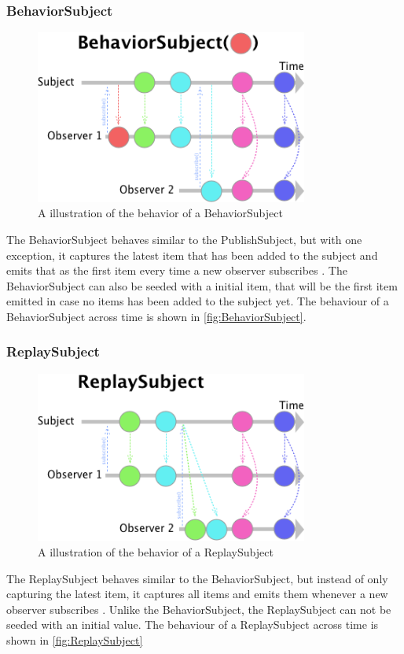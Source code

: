 \subsubsection*{BehaviorSubject}
\begin{figure}[h]
    \centering
    \includegraphics[width=0.8\textwidth]{figures/BehaviorSubject.png}
    \caption{A illustration of the behavior of a BehaviorSubject}
    \label{fig:BehaviorSubject}
\end{figure}
The BehaviorSubject behaves similar to the PublishSubject, but with one exception, it captures the latest item that has been added to the subject and emits that as the first item every time a new observer subscribes \cite{BehaviorSubject}. The BehaviorSubject can also be seeded with a initial item, that will be the first item emitted in case no items has been added to the subject yet. The behaviour of a BehaviorSubject across time is shown in \autoref{fig:BehaviorSubject}.

\subsubsection*{ReplaySubject}
\begin{figure}[h]
    \centering
    \includegraphics[width=0.8\textwidth]{figures/ReplaySubject.png}
    \caption{A illustration of the behavior of a ReplaySubject}
    \label{fig:ReplaySubject}
\end{figure}
The ReplaySubject behaves similar to the BehaviorSubject, but instead of only capturing the latest item, it captures all items and emits them whenever a new observer subscribes \cite{ReplaySubject}. Unlike the BehaviorSubject, the ReplaySubject can not be seeded with an initial value. The behaviour of a ReplaySubject across time is shown in \autoref{fig:ReplaySubject}

